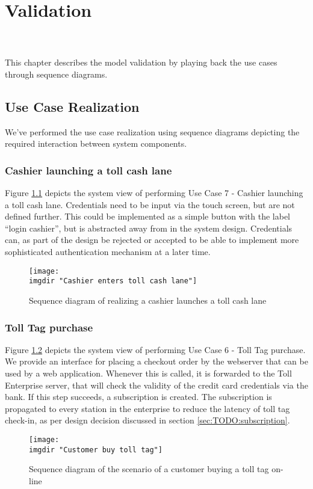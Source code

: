 \chapter{Validation}
\kim \\\\
This chapter describes the model validation by playing back the use cases through sequence diagrams.
\section{Use Case Realization}
We've performed the use case realization using sequence diagrams depicting the required interaction between system components.
\subsection{Cashier launching a toll cash lane}
Figure \ref{fig:seq_diag:launches_a_toll_cash_lane} depicts the system view of performing Use Case 7 - Cashier launching a toll cash lane. Credentials need to be input via the touch screen, but are not defined further. This could be implemented as a simple button with the label ``login cashier'', but is abstracted away from in the system design. Credentials can, as part of the design be rejected or accepted to be able to implement more sophisticated authentication mechanism at a later time.
\begin{figure} %
  \texttt{[image: \\imgdir "Cashier enters toll cash lane"]}
  \caption{Sequence diagram of realizing a cashier launches a toll cash lane}
  \label{fig:seq_diag:launches_a_toll_cash_lane}
\end{figure}

\subsection{Toll Tag purchase}
Figure \ref{fig:seq_diag:customer_orders_toll_tag_online} depicts the system view of performing Use Case 6 - Toll Tag purchase. We provide an interface for placing a checkout order by the webserver that can be used by a web application. Whenever this is called, it is forwarded to the Toll Enterprise server, that will check the validity of the credit card credentials via the bank. If this step succeeds, a subscription is created. The subscription is propagated to every station in the enterprise to reduce the latency of toll tag check-in, as per design decision discussed in section \ref{sec:TODO:subscription}.
\begin{figure} %
  \texttt{[image: \\imgdir "Customer buy toll tag"]}
  \caption{Sequence diagram of the scenario of a customer buying a toll tag on-line}
  \label{fig:seq_diag:customer_orders_toll_tag_online}
\end{figure}

